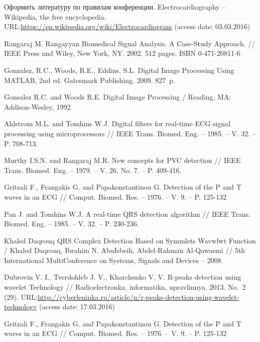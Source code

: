 \documentclass[runningheads]{AIIT}
\newcommand{\nnn}[2][rcolor]{\noindent%
\textcolor{eclr}{}\textcolor{#1}{#2}\textcolor{eclr}{}}
\begin{document}
%
%
 \begin{thebibliography}{99}
  \nnn{Оформить литературу по правилам конференции.}
  Electrocardiography -- Wikipedia, the free encyclopedia. URL:\url{https://en.wikipedia.org/wiki/Electrocardiogram} (access date: 03.03.2016)

  Rangaraj M. Rangayyan Biomedical Signal Analysis. A Case-Study Approach. // IEEE Press and Wiley, New York, NY. 2002. 512 pages. ISBN 0-471-20811-6

  Gonzalez, R.C., Woods, R.E., Eddins, S.L. Digital Image Processing Using MATLAB, 2nd ed. Gatesmark Publishing. 2009. 827~p.

  Gonsalez R.C. and Woods R.E. Digital Image Processing / Reading, MA: Addison-Wesley, 1992

  Ahlstrom M.L. and Tomhins W.J. Digital filters for real-time ECG signal processing using microprocessors // IEEE Trans. Biomed. Eng. – 1985. – V. 32. – P. 708-713.

  Murthy I.S.N. and Rangaraj M.R. New concepts for PVC detection // IEEE Trans. Biomed. Eng. – 1979. – V. 26, No. 7. – P. 409-416.

  Gritzali F., Frangakis G. and Papakonstantinou G. Detection of the P and T waves in an ECG // Comput. Biomed. Res. – 1976. – V. 9. – P. 125-132

  Pan J. and Tomhins W.J. A real-time QRS detection algorithm // IEEE Trans. Biomed. Eng. – 1985. – V. 32. – P. 230-236.

  Khaled Daqrouq QRS Complex Detection Based on Symmlets Wavwlwt Function / Khaled Daqrouq, Ibrahim N. AbuIsbeih, Abdel-Rahman Al-Qawasmi // 5th International MultiConference on Systems, Signals and Devices – 2008

  Dubrovin V. I., Tverdohleb J. V., Kharchenko V. V. R-peaks detection using wavelet Technology // Radioelectronka, informatika, upravlinnya. 2013. No.~2 (29). URL:\url{http://cyberleninka.ru/article/n/r-peaks-detection-using-wavelet-technology} (access date: 17.03.2016)

  Gritzali F., Frangakis G. and Papakonstantinou G. Detection of the P and T waves in an ECG // Comput. Biomed. Res. – 1976. – V. 9. – P. 125-132
 \end{thebibliography}


%
%

\end{document}
